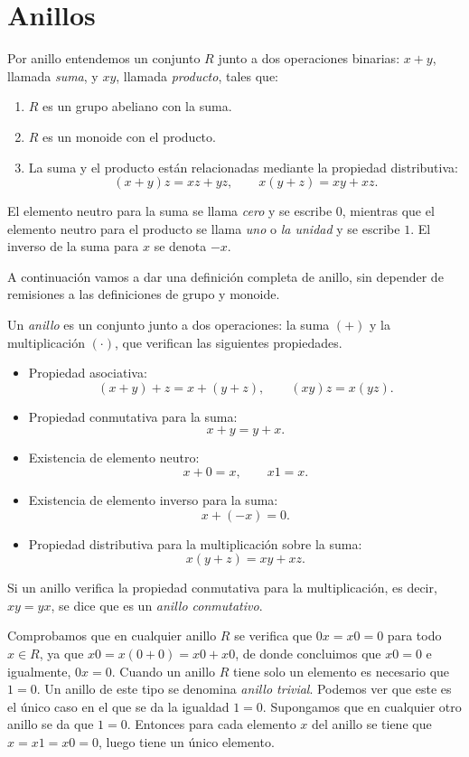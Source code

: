 \section{Anillos}
\label{sec:anillos}

Por anillo entendemos un conjunto \(R\) junto a dos operaciones binarias: \(x + y\), llamada \textit{suma}, y \(xy\), llamada \textit{producto}, tales que:
\begin{enumerate}
  \item \(R\) es un grupo abeliano con la suma.
  \item \(R\) es un monoide con el producto.
  \item La suma y el producto están relacionadas mediante la propiedad distributiva:
  \[
    (x+y)z = xz + yz, \qquad x(y+z) = xy + xz.
  \]
\end{enumerate}
El elemento neutro para la suma se llama \textit{cero} y se escribe \(0\), mientras que el elemento neutro para el producto se llama \textit{uno} o \textit{la unidad} y se escribe \(1\).
El inverso de la suma para \(x\) se denota \(-x\).

A continuación vamos a dar una definición completa de anillo, sin depender de remisiones a las definiciones de grupo y monoide.

\begin{definition}
  Un \textit{anillo} es un conjunto junto a dos operaciones: la suma \((+)\) y la multiplicación \((\cdot)\), que verifican las siguientes propiedades.
  \begin{itemize}[itemsep=0pt]
    \item Propiedad asociativa:
    \[(x+y)+z = x + (y+z), \qquad (xy)z = x(yz).\]
    \item Propiedad conmutativa para la suma:
    \[x + y = y + x.\]
    \item Existencia de elemento neutro:
    \[x + 0 = x, \qquad x1 = x.\]
    \item Existencia de elemento inverso para la suma:
    \[x + (-x) = 0.\]
    \item Propiedad distributiva para la multiplicación sobre la suma:
    \[x(y+z) = xy + xz.\]
  \end{itemize}

  Si un anillo verifica la propiedad conmutativa para la multiplicación, es decir, \(xy = yx\), se dice que es un \textit{anillo conmutativo}.
\end{definition}

Comprobamos que en  cualquier anillo \(R\) se verifica que \(0x = x0 = 0\) para todo \(x \in R\), ya que \(x0 = x(0+0) = x0 + x0\), de donde concluimos que \(x0 = 0\) e igualmente, \(0x = 0\).
Cuando un anillo \(R\) tiene solo un elemento es necesario que \(1 = 0\).
Un anillo de este tipo se denomina \textit{anillo trivial}.
Podemos ver que este es el único caso en el que se da la igualdad \(1 = 0\).
Supongamos que en cualquier otro anillo se da que \(1 = 0\). 
Entonces para cada elemento \(x\) del anillo se tiene que \(x = x1 = x0 = 0\), luego tiene un único elemento.

